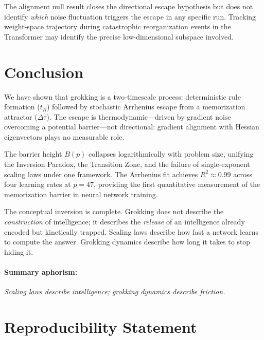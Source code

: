 \documentclass[11pt,twocolumn]{article}
\begin{document}
The alignment null result closes the directional escape hypothesis but does not identify \emph{which} noise fluctuation triggers the escape in any specific run. Tracking weight-space trajectory during catastrophic reorganization events in the Transformer may identify the precise low-dimensional subspace involved.

\section{Conclusion}

We have shown that grokking is a two-timescale process: deterministic rule formation ($t_R$) followed by stochastic Arrhenius escape from a memorization attractor ($\Delta\tau$). The escape is thermodynamic---driven by gradient noise overcoming a potential barrier---not directional: gradient alignment with Hessian eigenvectors plays no measurable role.

The barrier height $B(p)$ collapses logarithmically with problem size, unifying the Inversion Paradox, the Transition Zone, and the failure of single-exponent scaling laws under one framework. The Arrhenius fit achieves $R^2 \approx 0.99$ across four learning rates at $p=47$, providing the first quantitative measurement of the memorization barrier in neural network training.

The conceptual inversion is complete. Grokking does not describe the \emph{construction} of intelligence; it describes the \emph{release} of an intelligence already encoded but kinetically trapped. Scaling laws describe how fast a network learns to compute the answer. Grokking dynamics describe how long it takes to stop hiding it.

\paragraph{Summary aphorism:}
\begin{center}
\emph{Scaling laws describe intelligence; grokking dynamics describe friction.}
\end{center}

\section*{Reproducibility Statement}
\end{document}

